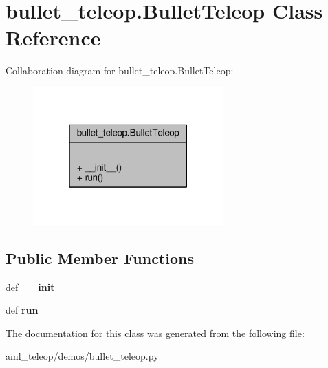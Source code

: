 \hypertarget{classbullet__teleop_1_1_bullet_teleop}{\section{bullet\-\_\-teleop.\-Bullet\-Teleop Class Reference}
\label{classbullet__teleop_1_1_bullet_teleop}
}


Collaboration diagram for bullet\-\_\-teleop.\-Bullet\-Teleop\-:
\nopagebreak
\begin{figure}[H]
\begin{center}
\leavevmode
\includegraphics[width=208pt]{classbullet__teleop_1_1_bullet_teleop__coll__graph}
\end{center}
\end{figure}
\subsection*{Public Member Functions}
\begin{DoxyCompactItemize}
\item 
\hypertarget{classbullet__teleop_1_1_bullet_teleop_a330166f967eb7d87e469d4780e2fc5ff}{def {\bfseries \-\_\-\-\_\-init\-\_\-\-\_\-}}\label{classbullet__teleop_1_1_bullet_teleop_a330166f967eb7d87e469d4780e2fc5ff}

\item 
\hypertarget{classbullet__teleop_1_1_bullet_teleop_aa35f423463941694e2e60431a757f6c7}{def {\bfseries run}}\label{classbullet__teleop_1_1_bullet_teleop_aa35f423463941694e2e60431a757f6c7}

\end{DoxyCompactItemize}


The documentation for this class was generated from the following file\-:\begin{DoxyCompactItemize}
\item 
aml\-\_\-teleop/demos/bullet\-\_\-teleop.\-py\end{DoxyCompactItemize}
